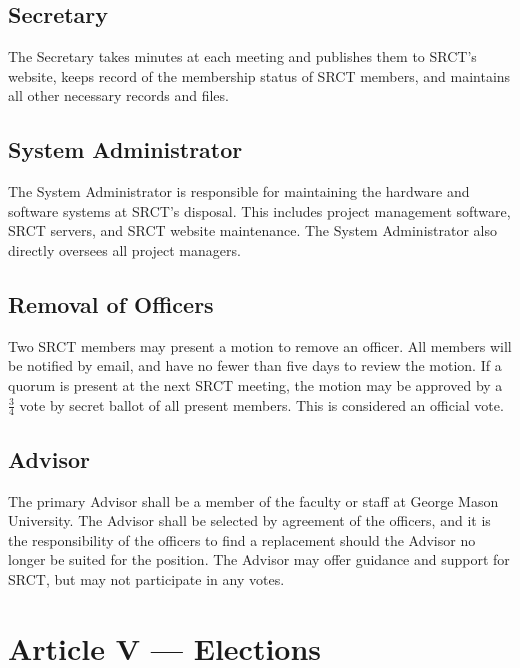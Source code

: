 \documentclass{article}
\begin{document}
  \subsection{Secretary}
  The Secretary takes minutes at each meeting and publishes them to 
  SRCT's website, keeps record of the membership status of SRCT members, 
  and maintains all other necessary records and files.
  
  \subsection{System Administrator}
  The System Administrator is responsible for maintaining the hardware 
  and software systems at SRCT's disposal. This includes project 
  management software, SRCT servers, and SRCT website maintenance. The
  System Administrator also directly oversees all project managers.

  \subsection{Removal of Officers}
  Two SRCT members may present a motion to remove an officer. All 
  members will be notified by email, and have no fewer than five days to 
  review the motion. If a quorum is present at the next SRCT meeting,
  the motion may be approved by a $\frac{3}{4}$ vote by secret ballot 
  of all present members. This is considered an official vote.
  
  \subsection{Advisor}
  The primary Advisor shall be a member of the faculty or staff at 
  George Mason University. The Advisor shall be selected by agreement of 
  the officers, and it is the responsibility of the officers to find a
  replacement should the Advisor no longer be suited for the position.
  The Advisor may offer guidance and support for SRCT, but may not 
  participate in any votes.
  
  \section{Article V --- Elections}
\end{document}
